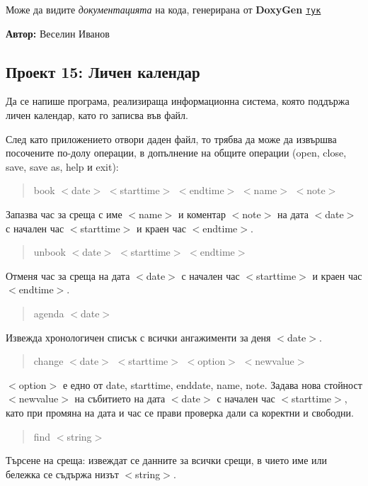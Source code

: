 Може да видите {\itshape документацията} на кода, генерирана от {\bfseries Doxy\+Gen} \href{https://ivanov1234159.github.io/Calendar/html/}{\tt тук}

{\bfseries Автор\+:} Веселин Иванов

\subsection*{Проект 15\+: Личен календар}

Да се напише програма, реализираща информационна система, която поддържа личен календар, като го записва във файл.

След като приложението отвори даден файл, то трябва да може да извършва посочените по-\/долу операции, в допълнение на общите операции (open, close, save, save as, help и exit)\+:

\begin{quote}
book $<$date$>$ $<$starttime$>$ $<$endtime$>$ $<$name$>$ $<$note$>$ \end{quote}


Запазва час за среща с име $<$name$>$ и коментар $<$note$>$ на дата $<$date$>$ с начален час $<$starttime$>$ и краен час $<$endtime$>$.

\begin{quote}
unbook $<$date$>$ $<$starttime$>$ $<$endtime$>$ \end{quote}


Отменя час за среща на дата $<$date$>$ с начален час $<$starttime$>$ и краен час $<$endtime$>$.

\begin{quote}
agenda $<$date$>$ \end{quote}


Извежда хронологичен списък с всички ангажименти за деня $<$date$>$.

\begin{quote}
change $<$date$>$ $<$starttime$>$ $<$option$>$ $<$newvalue$>$ \end{quote}


$<$option$>$ е едно от date, starttime, enddate, name, note. Задава нова стойност $<$newvalue$>$ на събитието на дата $<$date$>$ с начален час $<$starttime$>$, като при промяна на дата и час се прави проверка дали са коректни и свободни.

\begin{quote}
find $<$string$>$ \end{quote}


Търсене на среща\+: извеждат се данните за всички срещи, в чието име или бележка се съдържа низът $<$string$>$.

